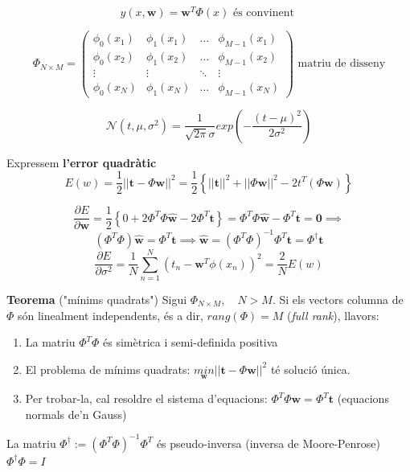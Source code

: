 $$
\boxed{y(x, \boldsymbol{w}) = \boldsymbol{w}^T \Phi(x)} \text{ és convinent }
$$

$$
\Phi_{N \times M} =
\begin{pmatrix}
\phi_0 (x_1) & \phi_1(x_1) & \ldots & \phi_{M-1} (x_1) \\
\phi_0 (x_2) & \phi_1(x_2) & \ldots & \phi_{M-1} (x_2) \\
\vdots & \vdots & \ddots & \vdots \\
\phi_0 (x_N) & \phi_1(x_N) & \ldots & \phi_{M-1} (x_N)
\end{pmatrix}
\text{ matriu de disseny}
$$

$$
\mathcal{N}(t, \mu, \sigma^2) = \frac{1}{\sqrt{2 \pi} \sigma} exp \left( - \frac{(t - \mu)^2}{2\sigma^2} \right)
$$

Expressem \textbf{l'error quadràtic}
$$
E(w) = \frac{1}{2} || \boldsymbol{t} - \Phi \boldsymbol{w} ||^2 = \frac{1}{2} \left\{ ||\boldsymbol{t}||^2 + ||\Phi \boldsymbol{w}||^2 - 2t^T(\Phi \boldsymbol{w}) \right\}
$$

$$
\frac{\partial E}{\partial \boldsymbol{w}} = \frac{1}{2} \left\{ 0 + 2 \Phi^T \Phi \hat{\boldsymbol{w}} - 2 \Phi^T \boldsymbol{t} \right\} = \Phi^T \Phi \hat{\boldsymbol{w}} - \Phi^T \boldsymbol{t} = \boldsymbol{0} \implies
$$
$$
\left( \Phi^T \Phi \right) \hat{\boldsymbol{w}} = \Phi^T \boldsymbol{t} \implies
\boxed{\hat{\boldsymbol{w}} = (\Phi^T \Phi)^{-1} \Phi^T \boldsymbol{t}} =
\Phi^{\dag} \boldsymbol{t}
$$
$$
\frac{\partial E}{\partial \sigma^2} = \frac{1}{N} \sum_{n=1}^N (t_n - \boldsymbol{w}^T \phi(x_n))^2 = \frac{2}{N} E(w)
$$

\textbf{Teorema} ("mínims quadrats")
Sigui $\Phi_{N\times M}, \quad N > M$. Si els vectors columna de $\Phi$ són linealment independents, és a dir, $rang(\Phi) = M$ (\emph{full rank}), llavors:

\begin{enumerate}
	\item La matriu $\Phi^T\Phi$ és simètrica i semi-definida positiva
	\item El problema de mínims quadrats: 
	$\underset{\boldsymbol{w}}{min} ||\boldsymbol{t} - \Phi \boldsymbol{w}||^2$ té solució única.
	\item Per trobar-la, cal resoldre el sistema d'equacions: $\Phi^T\Phi \boldsymbol{w} = \Phi^T \boldsymbol{t}$ (equacions normals de'n Gauss)
\end{enumerate}

La matriu $ \Phi^{\dag} := \left( \Phi^T \Phi \right)^{-1} \Phi^T $ és pseudo-inversa (inversa de Moore-Penrose) $ \Phi^{\dag} \Phi = I $

